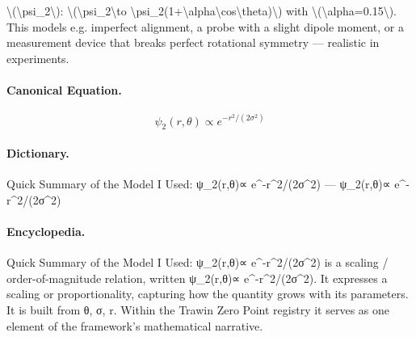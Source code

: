 \textbackslash{}(\textbackslash{}psi\_2\textbackslash{}): \textbackslash{}(\textbackslash{}psi\_2\textbackslash{}to \textbackslash{}psi\_2(1+\textbackslash{}alpha\textbackslash{}cos\textbackslash{}theta)\textbackslash{}) with \textbackslash{}(\textbackslash{}alpha=0.15\textbackslash{}). This models e.g. imperfect alignment, a probe with a slight dipole moment, or a measurement device that breaks perfect rotational symmetry — realistic in experiments.

\paragraph{Canonical Equation.}
\[
\psi_2(r,\theta)\propto e^{-r^2/(2\sigma^2)}
\]

\paragraph{Dictionary.}
Quick Summary of the Model I Used: ψ\_2(r,θ)∝ e\textasciicircum{}-r\textasciicircum{}2/(2σ\textasciicircum{}2) — ψ\_2(r,θ)∝ e\textasciicircum{}-r\textasciicircum{}2/(2σ\textasciicircum{}2)

\paragraph{Encyclopedia.}
Quick Summary of the Model I Used: ψ\_2(r,θ)∝ e\textasciicircum{}-r\textasciicircum{}2/(2σ\textasciicircum{}2) is a scaling / order-of-magnitude relation, written ψ\_2(r,θ)∝ e\textasciicircum{}-r\textasciicircum{}2/(2σ\textasciicircum{}2). It expresses a scaling or proportionality, capturing how the quantity grows with its parameters. It is built from θ, σ, r. Within the Trawin Zero Point registry it serves as one element of the framework's mathematical narrative.
